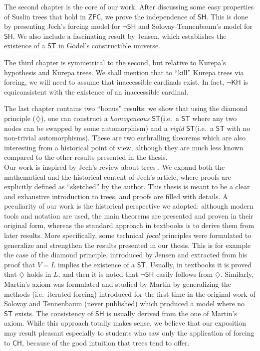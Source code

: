 \documentclass[11pt,a4paper]{report}
\theoremstyle{definition}
\theoremstyle{num.custom-title}
\theoremstyle{custom-title}
\newcommand{\ZFC}{\ensuremath{\mathsf{ZFC}}\xspace}
\newcommand{\CH}{\ensuremath{\mathsf{CH}}\xspace}
\newcommand{\SH}{\ensuremath{\mathsf{SH}}\xspace}
\newcommand{\nSH}{\ensuremath{\neg\mathsf{SH}}\xspace}
\newcommand{\ST}{\ensuremath{\mathsf{ST}}\xspace}
\newcommand{\KH}{\ensuremath{\mathsf{KH}}\xspace}
\begin{document}
The second chapter is the core of our work. After discussing some easy properties of Suslin trees that hold in \ZFC, we prove the independence of \SH. This is done by presenting Jech's forcing model for \nSH and Solovay-Tennenbaum's model for \SH. We also include a fascinating result by Jensen, which establishes the existence of a \ST in Gödel's constructible universe.

The third chapter is symmetrical to the second, but relative to Kurepa's hypothesis and Kurepa trees. We shall mention that to ``kill'' Kurepa trees via forcing, we will need to assume that inaccessible cardinals exist. In fact, $\neg\KH$ is equiconsistent with the existence of an inaccessible cardinal.

The last chapter contains two ``bonus'' results: we show that using the diamond principle ($\diamondsuit$), one can construct a \emph{homogeneous} \ST (i.e.\ a \ST where any two nodes can be swapped by some automorphism) and a \emph{rigid} \ST (i.e.\ a \ST with no non-trivial automorphisms). These are two enthralling theorems which are also interesting from a historical point of view, although they are much less known compared to the other results presented in the thesis.
\\[10pt]
\indent Our work is inspired by Jech's review about trees \cite{Jec1971}. We expand both the mathematical and the historical content of Jech's article, where proofs are explicitly defined as ``sketched'' by the author. This thesis is meant to be a clear and exhaustive introduction to trees, and proofs are filled with details. A peculiarity of our work is the historical perspective we adopted: although modern tools and notation are used, the main theorems are presented and proven in their original form, whereas the standard approach in textbooks is to derive them from later results. More specifically, some technical \emph{focal} principles were formulated to generalize and strengthen the results presented in our thesis. This is for example the case of the diamond principle, introduced by Jensen and extracted from his proof that $V=L$ implies the existence of a \ST. Usually, in textbooks it is proved that $\diamondsuit$ holds in $L$, and then it is noted that $\nSH$ easily follows from $\diamondsuit$. Similarly, Martin's axiom was formulated and studied by Martin by generalizing the methods (i.e.\ iterated forcing) introduced for the first time in the original work of Solovay and Tennenbaum (never published) which produced a model where no \ST exists. The consistency of \SH is usually derived from the one of Martin's axiom. While this approach totally makes sense, we believe that our exposition may result pleasant especially to students who saw only the application of forcing to \CH, because of the good intuition that trees tend to offer.
\end{document}
